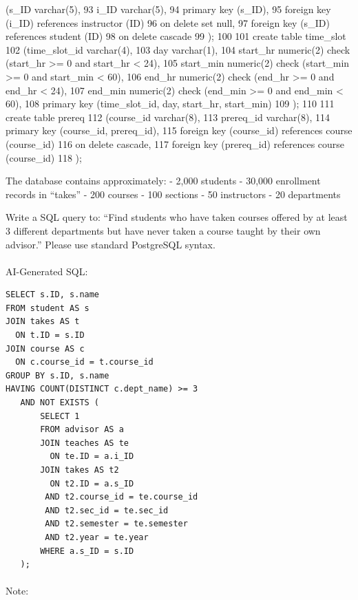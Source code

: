 \documentclass[
  letterpaper,
  DIV=11,
  numbers=noendperiod]{scrartcl}
\makeatletter
\let\oldparagraph\paragraph
\renewcommand{\paragraph}{
    \@ifstar
      \xxxParagraphStar
      \xxxParagraphNoStar
  }
\newcommand{\xxxParagraphStar}[1]{\oldparagraph*{#1}\mbox{}}
\newcommand{\xxxParagraphNoStar}[1]{\oldparagraph{#1}\mbox{}}
\makeatother
\begin{document}
(s\_ID varchar(5), 93 i\_ID varchar(5), 94 primary key (s\_ID), 95
foreign key (i\_ID) references instructor (ID) 96 on delete set null, 97
foreign key (s\_ID) references student (ID) 98 on delete cascade 99 );
100 101 create table time\_slot 102 (time\_slot\_id varchar(4), 103 day
varchar(1), 104 start\_hr numeric(2) check (start\_hr \textgreater= 0
and start\_hr \textless{} 24), 105 start\_min numeric(2) check
(start\_min \textgreater= 0 and start\_min \textless{} 60), 106 end\_hr
numeric(2) check (end\_hr \textgreater= 0 and end\_hr \textless{} 24),
107 end\_min numeric(2) check (end\_min \textgreater= 0 and end\_min
\textless{} 60), 108 primary key (time\_slot\_id, day, start\_hr,
start\_min) 109 ); 110 111 create table prereq 112 (course\_id
varchar(8), 113 prereq\_id varchar(8), 114 primary key (course\_id,
prereq\_id), 115 foreign key (course\_id) references course (course\_id)
116 on delete cascade, 117 foreign key (prereq\_id) references course
(course\_id) 118 );

The database contains approximately: - 2,000 students - 30,000
enrollment records in ``takes'' - 200 courses - 100 sections - 50
instructors - 20 departments

Write a SQL query to: ``Find students who have taken courses offered by
at least 3 different departments but have never taken a course taught by
their own advisor.'' Please use standard PostgreSQL syntax.

\paragraph{AI-Generated SQL:}\label{ai-generated-sql-4}

\begin{verbatim}
SELECT s.ID, s.name
FROM student AS s
JOIN takes AS t
  ON t.ID = s.ID
JOIN course AS c
  ON c.course_id = t.course_id
GROUP BY s.ID, s.name
HAVING COUNT(DISTINCT c.dept_name) >= 3
   AND NOT EXISTS (
       SELECT 1
       FROM advisor AS a
       JOIN teaches AS te
         ON te.ID = a.i_ID
       JOIN takes AS t2
         ON t2.ID = a.s_ID
        AND t2.course_id = te.course_id
        AND t2.sec_id = te.sec_id
        AND t2.semester = te.semester
        AND t2.year = te.year
       WHERE a.s_ID = s.ID
   );
\end{verbatim}

\paragraph{Note:}\label{note-4}
\end{document}

